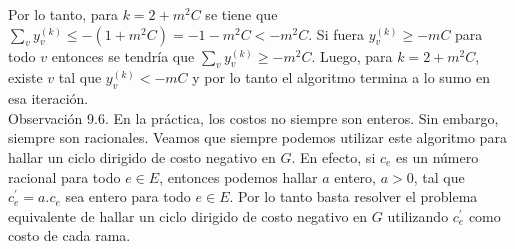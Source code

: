 \documentclass[10pt]{article}
\begin{document}
Por lo tanto, para $k=2+m^{2} C$ se tiene que $\sum_{v} y_{v}^{(k)} \leq-\left(1+m^{2} C\right)=-1-m^{2} C<-m^{2} C$. Si fuera $y_{v}^{(k)} \geq-m C$ para todo $v$ entonces se tendría que $\sum_{v} y_{v}^{(k)} \geq-m^{2} C$. Luego, para $k=2+m^{2} C$, existe $v$ tal que $y_{v}^{(k)}<-m C$ y por lo tanto el algoritmo termina a lo sumo en esa iteración.\\
Observación 9.6. En la práctica, los costos no siempre son enteros. Sin embargo, siempre son racionales. Veamos que siempre podemos utilizar este algoritmo para hallar un ciclo dirigido de costo negativo en $G$. En efecto, si $c_{e}$ es un número racional para todo $e \in E$, entonces podemos hallar $a$ entero, $a>0$, tal que $c_{e}^{\prime}=a . c_{e}$ sea entero para todo $e \in E$. Por lo tanto basta resolver el problema equivalente de hallar un ciclo dirigido de costo negativo en $G$ utilizando $c_{e}^{\prime}$ como costo de cada rama.
\end{document}
